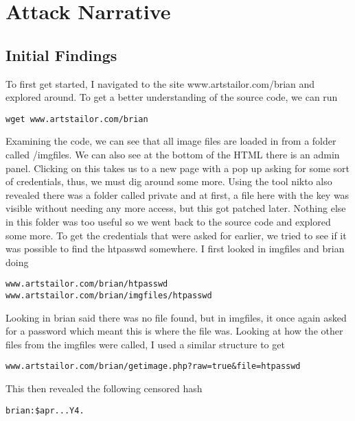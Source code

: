 \documentclass[notitlepage]{article}
\begin{document}
\section{Attack Narrative}

    \subsection{Initial Findings}	
    To first get started, I navigated to the site www.artstailor.com/brian and explored around. To get a better understanding of the source code, we can run
\begin{verbatim}
wget www.artstailor.com/brian
\end{verbatim}
    Examining the code, we can see that all image files are loaded in from a folder called /imgfiles. We can also see at the bottom of the HTML there is an admin panel. Clicking
    on this takes us to a new page with a pop up asking for some sort of credentials, thus, we must dig around some more. Using the tool nikto also revealed there was a folder called private
    and at first, a file here with the key was visible without needing any more access, but this got patched later. Nothing else in this folder was too useful so we went back to the source code
    and explored some more. To get the credentials that were asked for earlier, we tried to see if it was possible to find the htpasswd somewhere. I first looked in imgfiles and brian doing
\begin{verbatim}
www.artstailor.com/brian/htpasswd
www.artstailor.com/brian/imgfiles/htpasswd
\end{verbatim}
    Looking in brian said there was no file found, but in imgfiles, it once again asked for a password which meant this is where the file was. Looking at how the other files from the imgfiles were
    called, I used a similar structure to get 
\begin{verbatim}
www.artstailor.com/brian/getimage.php?raw=true&file=htpasswd
\end{verbatim}
    This then revealed the following censored hash
   \begin{verbatim}
brian:$apr...Y4.
   \end{verbatim}
\end{document}
